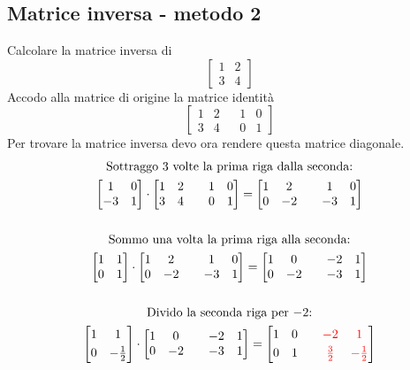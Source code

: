 \documentclass[italian]{article}
\begin{document}
\subsection{Matrice inversa - metodo 2}
Calcolare la matrice inversa di
\[
	\begin{bmatrix}
		1 & 2 \\
		3 & 4
	\end{bmatrix}
\]
Accodo alla matrice di origine la matrice identità
\[
	\begin{bmatrix}
		1 & 2 & & 1 & 0\\
		3 & 4 & & 0 & 1
	\end{bmatrix}
\]
Per trovare la matrice inversa devo ora rendere questa matrice diagonale.
\begin{gather*}
	\text{Sottraggo 3 volte la prima riga dalla seconda:}\\
	\begin{bmatrix}
		1 & 0 \\
		-3 & 1
	\end{bmatrix}
	\cdot
	\begin{bmatrix}
		1 & 2 & & 1 & 0\\
		3 & 4 & & 0 & 1
	\end{bmatrix}
	=
	\begin{bmatrix}
		1 & 2 & & 1 & 0\\
		0 & -2 & & -3 & 1
	\end{bmatrix}\\\\
	\text{Sommo una volta la prima riga alla seconda:}\\
	\begin{bmatrix}
		1 & 1 \\
		0 & 1
	\end{bmatrix}
	\cdot
	\begin{bmatrix}
		1 & 2 & & 1 & 0\\
		0 & -2 & & -3 & 1
	\end{bmatrix}
	=
	\begin{bmatrix}
		1 & 0 & & -2 & 1\\
		0 & -2 & & -3 & 1
	\end{bmatrix}\\\\
	\text{Divido la seconda riga per $-2$:}\\
	\begin{bmatrix}
		1 & 1 \\[1mm]
		0 & -\frac{1}{2}
	\end{bmatrix}
	\cdot
	\begin{bmatrix}
		1 & 0 & & -2 & 1\\
		0 & -2 & & -3 & 1
	\end{bmatrix}
	=
	\begin{bmatrix}
		1 & 0 & & \textcolor{red}{-2} & \textcolor{red}{1}\\[1mm]
		0 & 1 & & \textcolor{red}{\frac{3}{2}} & \textcolor{red}{-\frac{1}{2}}
	\end{bmatrix}
\end{gather*}
\end{document}
